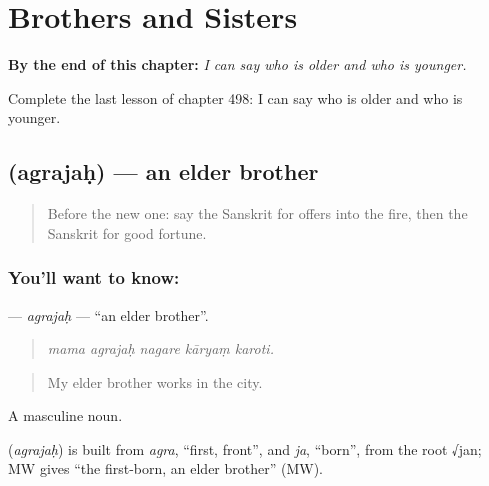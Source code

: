 
\chapter{Brothers and Sisters}
\label{ch:sa-brothers-and-sisters}

\begin{chapteropening}
\textbf{By the end of this chapter:} \emph{I can say who is older and who is younger.}

Complete the last lesson of chapter 498: I can say who is older and who is younger.
\end{chapteropening}

\section[\texorpdfstring{\sk{अग्रजः} (agrajaḥ)}{अग्रजः (agrajaḥ)}]{ (agrajaḥ) — an elder brother}

\label{lesson:SA-C498-agrajah}



\begin{quote}
Before the new one: say the Sanskrit for offers into the fire, then the Sanskrit for good fortune.
\end{quote}

\subsection*{You'll want to know: }
\textbf{} — \emph{agrajaḥ} — \textquotedblleft{}an elder brother\textquotedblright{}.

\begin{quote}
    
\end{quote}

\begin{quote}
\emph{mama agrajaḥ nagare kāryaṃ karoti.}
\end{quote}

\begin{quote}
My elder brother works in the city.
\end{quote}

A masculine noun.

\begin{cousinweb}
\textbf{} (\emph{agrajaḥ}) is built from \emph{agra}, \textquotedblleft{}first, front\textquotedblright{}, and \emph{ja}, \textquotedblleft{}born\textquotedblright{}, from the root √jan; MW gives \textquotedblleft{}the first-born, an elder brother\textquotedblright{} (MW).
\end{cousinweb}

